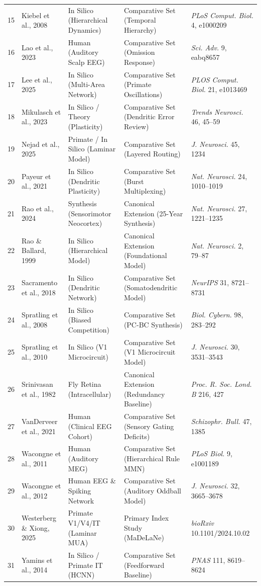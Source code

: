 \documentclass[12pt]{article}
\begin{document}
\begin{longtable}[]{@{}lllll@{}}
15 & Kiebel et al., 2008 & In Silico (Hierarchical Dynamics) & Comparative Set (Temporal Hierarchy) & \emph{PLoS Comput. Biol.} 4, e1000209 \\
16 & Lao et al., 2023 & Human (Auditory Scalp EEG) & Comparative Set (Omission Response) & \emph{Sci. Adv.} 9, eabq8657 \\
17 & Lee et al., 2025 & In Silico (Multi-Area Network) & Comparative Set (Primate Oscillations) & \emph{PLOS Comput. Biol.} 21, e1013469 \\
18 & Mikulasch et al., 2023 & In Silico / Theory (Plasticity) & Comparative Set (Dendritic Error Review) & \emph{Trends Neurosci.} 46, 45--59 \\
19 & Nejad et al., 2025 & Primate / In Silico (Laminar Model) & Comparative Set (Layered Routing) & \emph{J. Neurosci.} 45, 1234 \\
20 & Payeur et al., 2021 & In Silico (Dendritic Plasticity) & Comparative Set (Burst Multiplexing) & \emph{Nat. Neurosci.} 24, 1010--1019 \\
21 & Rao et al., 2024 & Synthesis (Sensorimotor Neocortex) & Canonical Extension (25-Year Synthesis) & \emph{Nat. Neurosci.} 27, 1221--1235 \\
22 & Rao \& Ballard, 1999 & In Silico (Hierarchical Model) & Canonical Extension (Foundational Model) & \emph{Nat. Neurosci.} 2, 79--87 \\
23 & Sacramento et al., 2018 & In Silico (Dendritic Network) & Comparative Set (Somatodendritic Model) & \emph{NeurIPS} 31, 8721--8731 \\
24 & Spratling et al., 2008 & In Silico (Biased Competition) & Comparative Set (PC-BC Synthesis) & \emph{Biol. Cybern.} 98, 283--292 \\
25 & Spratling et al., 2010 & In Silico (V1 Microcircuit) & Comparative Set (V1 Microcircuit Model) & \emph{J. Neurosci.} 30, 3531--3543 \\
26 & Srinivasan et al., 1982 & Fly Retina (Intracellular) & Canonical Extension (Redundancy Baseline) & \emph{Proc. R. Soc. Lond. B} 216, 427 \\
27 & VanDerveer et al., 2021 & Human (Clinical EEG Cohort) & Comparative Set (Sensory Gating Deficits) & \emph{Schizophr. Bull.} 47, 1385 \\
28 & Wacongne et al., 2011 & Human (Auditory MEG) & Comparative Set (Hierarchical Rule MMN) & \emph{PLoS Biol.} 9, e1001189 \\
29 & Wacongne et al., 2012 & Human EEG \& Spiking Network & Comparative Set (Auditory Oddball Model) & \emph{J. Neurosci.} 32, 3665--3678 \\
30 & Westerberg \& Xiong, 2025 & Primate V1/V4/IT (Laminar MUA) & Primary Index Study (MaDeLaNe) & \emph{bioRxiv} 10.1101/2024.10.02 \\
31 & Yamins et al., 2014 & In Silico / Primate IT (HCNN) & Comparative Set (Feedforward Baseline) & \emph{PNAS} 111, 8619--8624 \\
\end{longtable}
\end{document}
